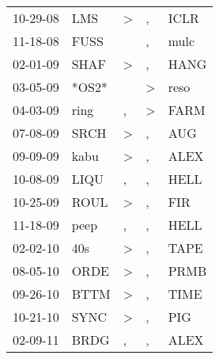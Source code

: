 \begin{supertabular}{p{0.07\textwidth}p{0.06\textwidth}p{0.02\textwidth}p{0.02\textwidth}p{0.06\textwidth}}
          10-29-08\textsuperscript{} &            LMS\textsuperscript{} &     \textgreater &             , &           ICLR\textsuperscript{} \\
          11-18-08\textsuperscript{} &           FUSS\textsuperscript{} &                  &             , &           mulc\textsuperscript{} \\
          02-01-09\textsuperscript{} &           SHAF\textsuperscript{} &     \textgreater &             , &           HANG\textsuperscript{} \\
          03-05-09\textsuperscript{} &                            *OS2* &                  &  \textgreater &           reso\textsuperscript{} \\
          04-03-09\textsuperscript{} &           ring\textsuperscript{} &                , &  \textgreater &           FARM\textsuperscript{} \\
          07-08-09\textsuperscript{} &           SRCH\textsuperscript{} &     \textgreater &             , &            AUG\textsuperscript{} \\
          09-09-09\textsuperscript{} &           kabu\textsuperscript{} &     \textgreater &             , &           ALEX\textsuperscript{} \\
          10-08-09\textsuperscript{} &           LIQU\textsuperscript{} &                , &             , &           HELL\textsuperscript{} \\
          10-25-09\textsuperscript{} &           ROUL\textsuperscript{} &     \textgreater &             , &            FIR\textsuperscript{} \\
          11-18-09\textsuperscript{} &           peep\textsuperscript{} &                , &             , &           HELL\textsuperscript{} \\
          02-02-10\textsuperscript{} &            40s\textsuperscript{} &     \textgreater &             , &           TAPE\textsuperscript{} \\
          08-05-10\textsuperscript{} &           ORDE\textsuperscript{} &     \textgreater &             , &           PRMB\textsuperscript{} \\
          09-26-10\textsuperscript{} &           BTTM\textsuperscript{} &     \textgreater &             , &           TIME\textsuperscript{} \\
          10-21-10\textsuperscript{} &           SYNC\textsuperscript{} &     \textgreater &             , &            PIG\textsuperscript{} \\
          02-09-11\textsuperscript{} &           BRDG\textsuperscript{} &                , &             , &           ALEX\textsuperscript{} \\

\end{supertabular}
